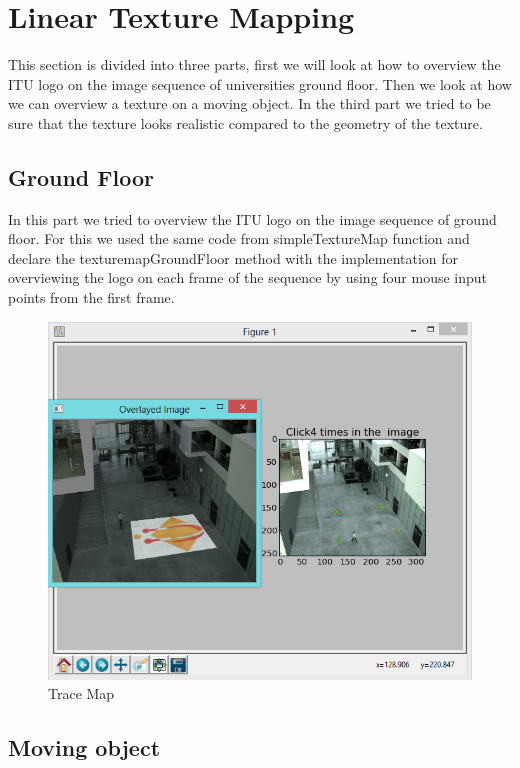\section{Linear Texture Mapping}

This section is divided into three parts, ﬁrst we will look at how to overview the ITU logo on the image sequence of universities ground floor. Then we look at how we can overview a texture on a moving object. In the third part we tried to be sure that the texture looks realistic compared to the geometry of the texture.

\subsection{Ground Floor}

In this part we tried to overview the ITU logo on the image sequence of ground floor. For this we used the same code from simpleTextureMap function and declare the texturemapGroundFloor method with the implementation for overviewing the logo on each frame of the sequence by using four mouse input points from the first frame.

\begin{figure}[h!]
	\centering
	\includegraphics[width=\textwidth]{Handin2/images/linearmapping.jpg}
	\caption{Trace Map}
	\label{fig:trace}
\end{figure}

\subsection{Moving object}

